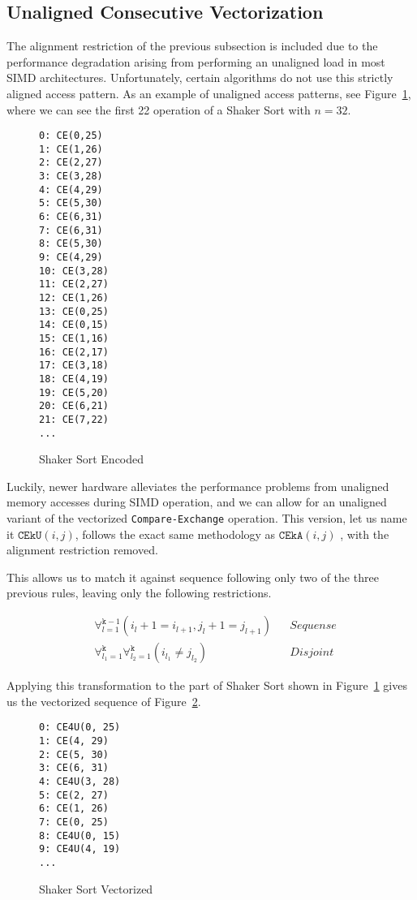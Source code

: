\subsection{Unaligned Consecutive Vectorization}

The alignment restriction of the previous subsection is included due to the performance degradation arising from performing an unaligned load in most SIMD architectures. Unfortunately, certain algorithms do not use this strictly aligned access pattern. As an example of unaligned access patterns, see Figure~\ref{fig:ShakerCE}, where we can see the first 22 operation of a Shaker Sort with $n=32$.

\begin{figure}
\begin{multicols}{3}
\begin{verbatim}
0: CE(0,25)
1: CE(1,26)
2: CE(2,27)
3: CE(3,28)
4: CE(4,29)
5: CE(5,30)
6: CE(6,31)
7: CE(6,31)
8: CE(5,30)
9: CE(4,29)
10: CE(3,28)
11: CE(2,27)
12: CE(1,26)
13: CE(0,25)
14: CE(0,15)
15: CE(1,16)
16: CE(2,17)
17: CE(3,18)
18: CE(4,19)
19: CE(5,20)
20: CE(6,21)
21: CE(7,22)
...
\end{verbatim}
\end{multicols}
\caption{Shaker Sort Encoded}
\label{fig:ShakerCE}
\end{figure}

Luckily, newer hardware alleviates the performance problems from unaligned memory accesses during SIMD operation, and we can allow for an unaligned variant of the vectorized  \texttt{Compare-Exchange} operation. This version, let us name it $\mathtt{CEkU}(i,j)$, follows the exact same methodology as $\mathtt{CEkA}(i,j)$ , with the alignment restriction removed.

This allows us to match it against sequence following only two of the three previous rules, leaving only the following restrictions.

\[
\begin{aligned}
&\forall_{l=1}^{\mathtt{k}-1} (i_l+1=i_{l+1}, j_l+1=j_{l+1}) && Sequense \\
&\forall_{l_1=1}^{\mathtt{k}} \forall_{l_2=1}^{\mathtt{k}} (i_{l_1} \neq j_{l_2})  && Disjoint
\end{aligned}
\]


Applying this transformation to the part of Shaker Sort shown in Figure~\ref{fig:ShakerCE} gives us the vectorized sequence of Figure~\ref{fig:ShakerCEU}.

\begin{figure}
\begin{multicols}{3}
\begin{verbatim}
0: CE4U(0, 25)
1: CE(4, 29)
2: CE(5, 30)
3: CE(6, 31)
4: CE4U(3, 28)
5: CE(2, 27)
6: CE(1, 26)
7: CE(0, 25)
8: CE4U(0, 15)
9: CE4U(4, 19)
...
\end{verbatim}
\end{multicols}
\caption{Shaker Sort Vectorized}
\label{fig:ShakerCEU}
\end{figure}

